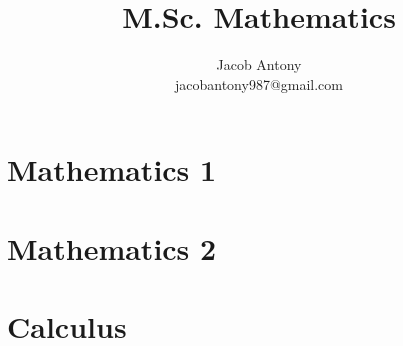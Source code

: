 \documentclass[a4paper,12pt,openany]{book}
\title{M.Sc. Mathematics}
\author{Jacob Antony\\jacobantony987@gmail.com}
\begin{document}
\tableofcontents

\part{Mathematics 1}

%

\part{Mathematics 2}
%

%

\part{Calculus}

%
%
%

%
%
%
\end{document}
